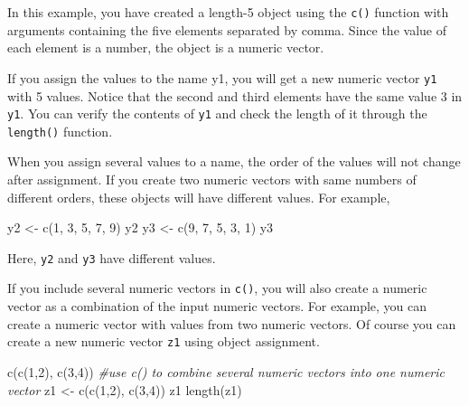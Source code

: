 \documentclass[
]{book}
\newenvironment{Shaded}{\begin{snugshade}}{\end{snugshade}}
\newcommand{\CommentTok}[1]{\textcolor[rgb]{0.56,0.35,0.01}{\textit{#1}}}
\newcommand{\DecValTok}[1]{\textcolor[rgb]{0.00,0.00,0.81}{#1}}
\newcommand{\FunctionTok}[1]{\textcolor[rgb]{0.00,0.00,0.00}{#1}}
\newcommand{\NormalTok}[1]{#1}
\newcommand{\OtherTok}[1]{\textcolor[rgb]{0.56,0.35,0.01}{#1}}
\newenvironment{blackbox}{
  \definecolor{shadecolor}{rgb}{0, 0, 0}  %
  \color{white}
  \begin{shaded}}
 {\end{shaded}}
\newenvironment{infobox}[1]
  {
  \begin{itemize}
  \renewcommand{\labelitemi}{
    \raisebox{-.7\height}[0pt][0pt]{
      {\setkeys{Gin}{width=3em,keepaspectratio}
        \texttt{[image: pics/\#1]}}
    }
  }
  \setlength{\fboxsep}{1em}
  \begin{blackbox}
  \item
  }
  {
  \end{blackbox}
  \end{itemize}
  }
\begin{document}
In this example, you have created a length-5 object using the \texttt{c()} function with arguments containing the five elements separated by comma. Since the value of each element is a number, the object is a numeric vector.

If you assign the values to the name y1, you will get a new numeric vector \texttt{y1} with 5 values. Notice that the second and third elements have the same value 3 in \texttt{y1}. You can verify the contents of \texttt{y1} and check the length of it through the \texttt{length()} function.

\begin{infobox}{caution}
When you assign several values to a name, the order of the values will not change after assignment. If you create two numeric vectors with same numbers of different orders, these objects will have different values. For example,

\begin{Shaded}
\begin{Highlighting}[]
\NormalTok{y2 }\OtherTok{\textless{}{-}} \FunctionTok{c}\NormalTok{(}\DecValTok{1}\NormalTok{, }\DecValTok{3}\NormalTok{, }\DecValTok{5}\NormalTok{, }\DecValTok{7}\NormalTok{, }\DecValTok{9}\NormalTok{)    }
\NormalTok{y2                        }
\NormalTok{y3 }\OtherTok{\textless{}{-}} \FunctionTok{c}\NormalTok{(}\DecValTok{9}\NormalTok{, }\DecValTok{7}\NormalTok{, }\DecValTok{5}\NormalTok{, }\DecValTok{3}\NormalTok{, }\DecValTok{1}\NormalTok{)    }
\NormalTok{y3}
\end{Highlighting}
\end{Shaded}

Here, \texttt{y2} and \texttt{y3} have different values.

\end{infobox}

If you include several numeric vectors in \texttt{c()}, you will also create a numeric vector as a combination of the input numeric vectors. For example, you can create a numeric vector with values from two numeric vectors. Of course you can create a new numeric vector \texttt{z1} using object assignment.

\begin{Shaded}
\begin{Highlighting}[]
\FunctionTok{c}\NormalTok{(}\FunctionTok{c}\NormalTok{(}\DecValTok{1}\NormalTok{,}\DecValTok{2}\NormalTok{), }\FunctionTok{c}\NormalTok{(}\DecValTok{3}\NormalTok{,}\DecValTok{4}\NormalTok{))          }\CommentTok{\#use c() to combine several numeric vectors into one numeric vector}
\NormalTok{z1 }\OtherTok{\textless{}{-}} \FunctionTok{c}\NormalTok{(}\FunctionTok{c}\NormalTok{(}\DecValTok{1}\NormalTok{,}\DecValTok{2}\NormalTok{), }\FunctionTok{c}\NormalTok{(}\DecValTok{3}\NormalTok{,}\DecValTok{4}\NormalTok{))}
\NormalTok{z1}
\FunctionTok{length}\NormalTok{(z1)}
\end{Highlighting}
\end{Shaded}
\end{document}
